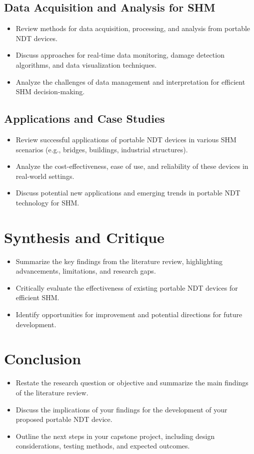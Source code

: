 \documentclass[journal, a4paper]{IEEEtran}
\begin{document}
\subsection{Data Acquisition and Analysis for SHM}
\begin{itemize}
  \item Review methods for data acquisition, processing, and analysis from portable NDT devices.
  \item Discuss approaches for real-time data monitoring, damage detection algorithms, and data visualization techniques.
  \item Analyze the challenges of data management and interpretation for efficient SHM decision-making.
\end{itemize}

\subsection{Applications and Case Studies}
\begin{itemize}
  \item Review successful applications of portable NDT devices in various SHM scenarios (e.g., bridges, buildings, industrial structures).
  \item Analyze the cost-effectiveness, ease of use, and reliability of these devices in real-world settings.
  \item Discuss potential new applications and emerging trends in portable NDT technology for SHM.
\end{itemize}


\section{Synthesis and Critique}
\begin{itemize}
  \item Summarize the key findings from the literature review, highlighting advancements, limitations, and research gaps.
  \item Critically evaluate the effectiveness of existing portable NDT devices for efficient SHM.
  \item Identify opportunities for improvement and potential directions for future development.
\end{itemize}


\section{Conclusion}
\begin{itemize}
  \item Restate the research question or objective and summarize the main findings of the literature review.
  \item Discuss the implications of your findings for the development of your proposed portable NDT device.
  \item Outline the next steps in your capstone project, including design considerations, testing methods, and expected outcomes.
\end{itemize}
\end{document}
